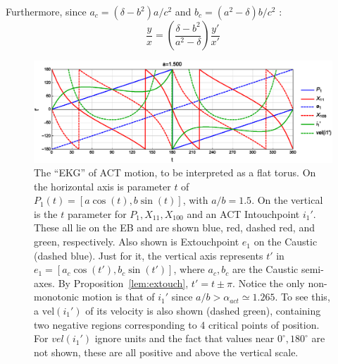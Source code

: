 Furthermore, since  $a_c=(\delta-{b}^{2})a/c^2$ and $b_c=({a}^{2}-\delta)b/c^2$ \cite{garcia2020-new-properties}: 
%
\begin{equation}
\frac{y}{x}=\left(\frac{\delta-b^2}{a^2-\delta}\right)\frac{y'}{x'}
\end{equation}
%
\begin{figure}
    \centering
    \includegraphics[width=\textwidth]{pics/1110_act_progress_clean_15.eps}
    \caption{The ``EKG'' of ACT motion, to be interpreted as a flat torus. On the horizontal axis is parameter $t$ of $P_1(t)=[a\cos(t),b\sin(t)]$, with $a/b=1.5$. On the vertical is the $t$ parameter for $P_1,X_{11},X_{100}$ and an ACT Intouchpoint $i_1'$. These all lie on the EB and are shown blue, red, dashed red, and green, respectively. Also shown is Extouchpoint $e_1$ on the Caustic (dashed blue). Just for it, the vertical axis represents $t'$ in $e_1=[a_c\cos(t'),b_c\sin(t')]$, where $a_c,b_c$ are the Caustic semi-axes. By Proposition~\ref{lem:extouch}, $t'=t{\pm}\pi$. Notice the only non-monotonic motion is that of $i_1'$ since $a/b>\alpha_{act}{\simeq}1.265$. To see this, a $\text{vel}(i_1')$ of its velocity is also shown (dashed green), containing two negative regions corresponding to 4 critical points of position. For $vel(i_1')$ ignore units and the fact that values near $0^\circ,180^\circ$ are not shown, these are all positive and above the vertical scale.}
    \label{fig:act-progress}
\end{figure}